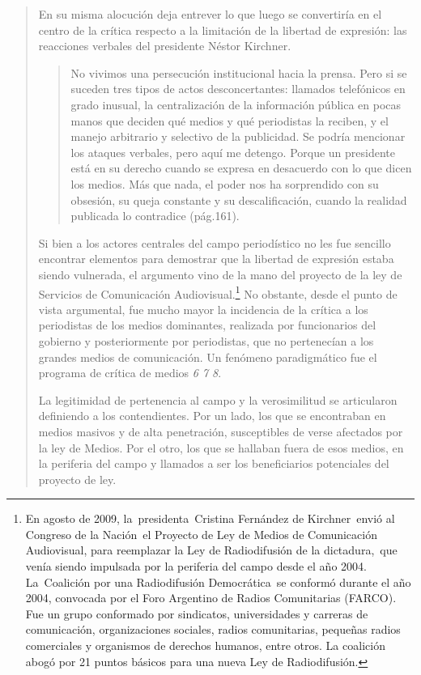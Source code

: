 \begin{quote}
En su misma alocución deja entrever lo que luego se convertiría en el centro de la crítica respecto a la limitación de la libertad de expresión: las reacciones verbales del presidente Néstor Kirchner.

\begin{quote}
	No vivimos una persecución institucional hacia la prensa. Pero si se suceden tres tipos de actos desconcertantes: llamados telefónicos en grado inusual, la centralización de la información pública en pocas manos que deciden qué medios y qué periodistas la reciben, y el manejo arbitrario y selectivo de la publicidad. Se podría mencionar los ataques verbales, pero aquí me detengo. Porque un presidente está en su derecho cuando se expresa en desacuerdo con lo que dicen los medios. Más que nada, el poder nos ha sorprendido con su obsesión, su queja constante y su descalificación, cuando la realidad publicada lo contradice (pág.161).
\end{quote}


Si bien a los actores centrales del campo periodístico no les fue sencillo encontrar elementos para demostrar que la libertad de expresión estaba siendo vulnerada, el argumento vino de la mano del proyecto de la ley de Servicios de Comunicación Audiovisual.\footnote{En agosto de 2009, la presidenta Cristina Fernández de Kirchner envió al Congreso de la Nación el Proyecto de Ley de Medios de Comunicación Audiovisual, para reemplazar la Ley de Radiodifusión de la dictadura, que venía siendo impulsada por la periferia del campo desde el año 2004. La Coalición por una Radiodifusión Democrática se conformó durante el año 2004, convocada por el Foro Argentino de Radios Comunitarias (FARCO). Fue un grupo conformado por sindicatos, universidades y carreras de comunicación, organizaciones sociales, radios comunitarias, pequeñas radios comerciales y organismos de derechos humanos, entre otros. La coalición abogó por 21 puntos básicos para una nueva Ley de Radiodifusión.} No obstante, desde el punto de vista argumental, fue mucho mayor la incidencia de la crítica a los periodistas de los medios dominantes, realizada por funcionarios del gobierno y posteriormente por periodistas, que no pertenecían a los grandes medios de comunicación. Un fenómeno paradigmático fue el programa de crítica de medios \emph{6 7 8}.

La legitimidad de pertenencia al campo y la verosimilitud se articularon definiendo a los contendientes. Por un lado, los que se encontraban en medios masivos y de alta penetración, susceptibles de verse afectados por la ley de Medios. Por el otro, los que se hallaban fuera de esos medios, en la periferia del campo y llamados a ser los beneficiarios potenciales del proyecto de ley.


\end{quote}
